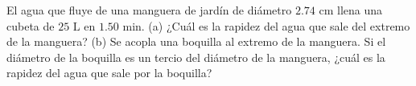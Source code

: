 \item El agua que fluye de una manguera de jardín de diámetro $2.74 \text{ cm}$ llena una cubeta de $25 \text{ L}$ en $1.50 \text{ min}$. (a) ¿Cuál es la rapidez del agua que sale del extremo de la manguera? (b) Se acopla una boquilla al extremo de la manguera. Si el diámetro de la boquilla es un tercio del diámetro de la manguera, ¿cuál es la rapidez del agua que sale por la boquilla?
